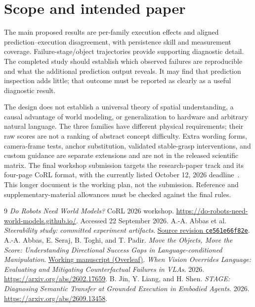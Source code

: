 \documentclass[11pt]{article}
\begin{document}
\section{Scope and intended paper}
The main proposed results are per-family execution effects and aligned prediction--execution disagreement, with persistence skill and measurement coverage. Failure-stage/object trajectories provide supporting diagnostic detail. The completed study should establish which observed failures are reproducible and what the additional prediction output reveals. It may find that prediction inspection adds little; that outcome must be reported as clearly as a useful diagnostic result.

The design does not establish a universal theory of spatial understanding, a causal advantage of world modeling, or generalization to hardware and arbitrary natural language. The three families have different physical requirements; their raw scores are not a ranking of abstract concept difficulty. Extra wording forms, camera-frame tests, anchor substitution, validated stable-grasp interventions, and custom guidance are separate extensions and are not in the released scientific matrix. The final workshop submission targets the research-paper track and its four-page CoRL format, with the currently listed October 12, 2026 deadline~\cite{workshop}. This longer document is the working plan, not the submission. Reference and supplementary-material allowances must be checked against the final rules.

\begingroup\footnotesize\raggedright
\begin{thebibliography}{9}
 \emph{Do Robots Need World Models?} CoRL 2026 workshop. \url{https://do-robots-need-world-models.github.io/}. Accessed 22 September 2026.
 A.-A. Abbas et al. \emph{Steerability study: committed experiment artifacts}. \href{https://github.com/adeeb10abbas/steerable/tree/ce561e66f82e95055e39d3d7711691982f6b2086}{Source revision \texttt{ce561e66f82e}}.
 A.-A. Abbas, E. Seraj, B. Toghi, and T. Padir. \emph{Move the Objects, Move the Score: Understanding Directional Success Gaps in Language-conditioned Manipulation}. \href{https://www.overleaf.com/project/6a82672ecde49ed541431887}{Working manuscript (Overleaf)}.
 \emph{When Vision Overrides Language: Evaluating and Mitigating Counterfactual Failures in VLAs}. 2026. \url{https://arxiv.org/abs/2602.17659}.
 B. Jin, Y. Liang, and H. Shen. \emph{STAGE: Diagnosing Semantic Transfer at Grounded Execution in Embodied Agents}. 2026. \url{https://arxiv.org/abs/2609.13458}.
\end{thebibliography}
\endgroup
\end{document}

